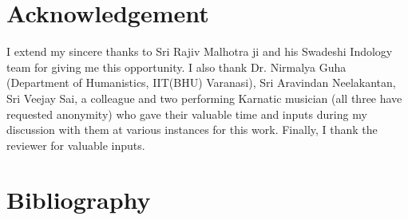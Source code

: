 \section*{Acknowledgement}

I extend my sincere thanks to Sri Rajiv Malhotra ji and his Swadeshi Indology team for giving me this opportunity. I also thank Dr. Nirmalya Guha (Department of Humanistics, IIT(BHU) Varanasi), Sri Aravindan Neelakantan, Sri Veejay Sai, a colleague and two performing Karnatic musician (all three have requested anonymity) who gave their valuable time and inputs during my discussion with them at various instances for this work. Finally, I thank the reviewer for valuable inputs.


\section*{Bibliography}

